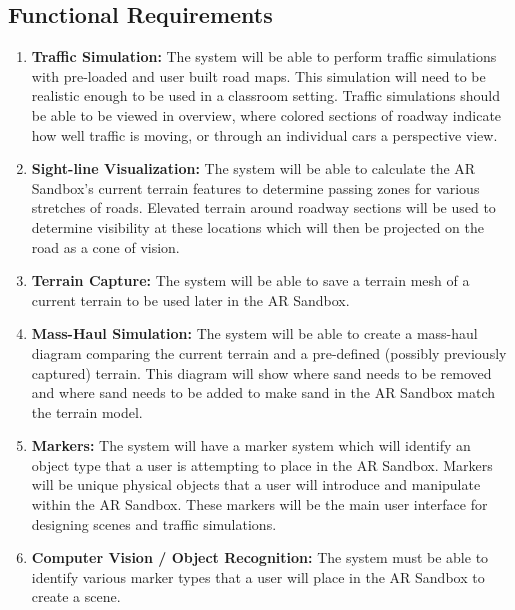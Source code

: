 \documentclass[letterpaper, 10pt, onecolumn, draftclsnofoot]{IEEEtran}
\begin{document}
    \subsection{\textbf{Functional Requirements}}
    \begin{enumerate}[\label={}]
    
        \item{\textbf{Traffic Simulation:} The system will be able to perform traffic simulations with pre-loaded and user built road maps. This simulation will need to be realistic enough to be used in a classroom setting. Traffic simulations should be able to be viewed in overview, where colored sections of roadway indicate how well traffic is moving, or through an individual cars a perspective view.}
        
        \item{\textbf{Sight-line Visualization:} The system will be able to calculate the AR Sandbox's current terrain features to determine passing zones for various stretches of roads. Elevated terrain around roadway sections will be used to determine visibility at these locations which will then be projected on the road as a cone of vision.}
        
        \item{\textbf{Terrain Capture:} The system will be able to save a terrain mesh of a current terrain to be used later in the AR Sandbox.}
        
        \item{\textbf{Mass-Haul Simulation:} The system will be able to create a mass-haul diagram comparing the current terrain and a pre-defined (possibly previously captured) terrain. This diagram will show where sand needs to be removed and where sand needs to be added to make sand in the AR Sandbox match the terrain model.}
        
        \item{\textbf{Markers:} The system will have a marker system which will identify an object type that a user is attempting to place in the AR Sandbox. Markers will be unique physical objects that a user will introduce and manipulate within the AR Sandbox. These markers will be the main user interface for designing scenes and traffic simulations.}
        
        \item{\textbf{Computer Vision / Object Recognition:} The system must be able to identify various marker types that a user will place in the AR Sandbox to create a scene.}
        

\end{enumerate}
\end{document}
